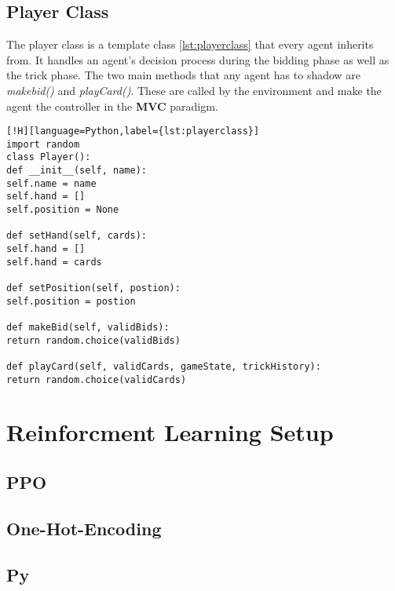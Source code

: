 \subsection{Player Class}
The player class is a template class \ref{lst:playerclass} that every agent inherits from.
It handles an agent's decision process during the bidding phase as well as the trick phase.
The two main methods that any agent has to shadow are \textit{makebid()} and \textit{playCard()}.
These are called by the environment and make the agent the controller in the \textbf{MVC} paradigm.
\newline
\begin{lstlisting}[!H][language=Python,label={lst:playerclass}]
import random
class Player():
def __init__(self, name):
self.name = name
self.hand = []
self.position = None

def setHand(self, cards):
self.hand = []
self.hand = cards

def setPosition(self, postion):
self.position = postion

def makeBid(self, validBids):
return random.choice(validBids)

def playCard(self, validCards, gameState, trickHistory):
return random.choice(validCards)
\end{lstlisting}
\section{Reinforcment Learning Setup}
\subsection{PPO}
\subsection{One-Hot-Encoding}
\subsection{Py}